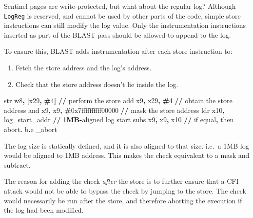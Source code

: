 \documentclass[a4paper, nobind]{templates/ociamthesis}
\providecommand{\tightlist}{%
  \setlength{\itemsep}{0pt}\setlength{\parskip}{0pt}}
\newenvironment{Shaded}{\begin{snugshade}}{\end{snugshade}}
\newcommand{\BaseNTok}[1]{\textcolor[rgb]{0.00,0.00,0.81}{#1}}
\newcommand{\BuiltInTok}[1]{#1}
\newcommand{\DecValTok}[1]{\textcolor[rgb]{0.00,0.00,0.81}{#1}}
\newcommand{\ErrorTok}[1]{\textcolor[rgb]{0.64,0.00,0.00}{\textbf{#1}}}
\newcommand{\NormalTok}[1]{#1}
\newcommand{\OperatorTok}[1]{\textcolor[rgb]{0.81,0.36,0.00}{\textbf{#1}}}
\renewenvironment{Shaded}
{
  \vspace{10pt}%
  \begin{snugshade}%
}{%
  \end{snugshade}%
  \vspace{8pt}%
}
\begin{document}
Sentinel pages are write-protected, but what about the regular log?
Although \texttt{LogReg} is reserved, and cannot be used by other parts of the code,
simple store instructions can still modify the log value. Only the instrumentation
instructions inserted as part of the BLAST pass should be allowed to append to the log.

To ensure this, BLAST adds instrumentation after each store instruction to:

\begin{enumerate}
\def\labelenumi{\arabic{enumi}.}
\tightlist
\item
  Fetch the store address and the log's address.
\item
  Check that the store address doesn't lie inside the log.
\end{enumerate}

\begin{Shaded}
\begin{Highlighting}[]
\BuiltInTok{str}\NormalTok{ w8}\OperatorTok{,} \OperatorTok{[}\NormalTok{x29}\OperatorTok{,} \OperatorTok{\#}\DecValTok{4}\OperatorTok{]}                 \OperatorTok{//}\NormalTok{ perform the store}
\BuiltInTok{add}\NormalTok{ x9}\OperatorTok{,}\NormalTok{ x29}\OperatorTok{,} \OperatorTok{\#}\DecValTok{4}                   \OperatorTok{//}\NormalTok{ obtain the store address}
\BuiltInTok{and}\NormalTok{ x9}\OperatorTok{,}\NormalTok{ x9}\OperatorTok{,} \OperatorTok{\#}\BaseNTok{0x7ffffffffff00000}   \OperatorTok{//}\NormalTok{ mask the store address}
\NormalTok{ldr x10}\OperatorTok{,}\NormalTok{ log\_start\_addr           }\OperatorTok{//} \DecValTok{1}\ErrorTok{MB}\OperatorTok{{-}}\NormalTok{aligned log start}
\NormalTok{subs x9}\OperatorTok{,}\NormalTok{ x9}\OperatorTok{,}\NormalTok{ x10                  }\OperatorTok{//}\NormalTok{ if equal}\OperatorTok{,}\NormalTok{ then abort}\OperatorTok{.}
\NormalTok{b}\OperatorTok{.}\NormalTok{e \_abort}
\end{Highlighting}
\end{Shaded}

The log size is statically defined, and it is also aligned to that size.
i.e.~a 1MB log would be aligned to 1MB address. This makes the check equivalent
to a mask and subtract.

The reason for adding the check \emph{after} the store is to further ensure that a
CFI attack would not be able to bypass the check by jumping to the store.
The check would necessarily be run after the store, and therefore aborting the
execution if the log had been modified.
\end{document}
